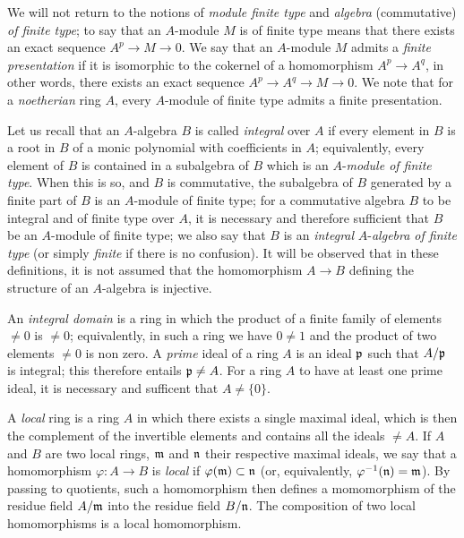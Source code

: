 \documentclass[../main.tex]{subfiles}
\begin{document}
\begin{cx}[1.0.5]
We will not return to the notions of \emph{module finite type} and
\emph{algebra} (commutative) \emph{of finite type}; to say that an $A$-module $M$
is of finite type means that there exists an exact sequence $A^p\to M\to 0$. We say that
an $A$-module $M$ admits a \emph{finite presentation} if it is isomorphic to the cokernel
of a homomorphism $A^p\to A^q$, in other words, there exists an exact sequence
$A^p\to A^q\to M\to 0$. We note that for a \emph{noetherian} ring $A$, every $A$-module
of finite type admits a finite presentation.

Let us recall that an $A$-algebra $B$ is called \emph{integral} over $A$ if every element
in $B$ is a root in $B$ of a monic polynomial with coefficients in $A$; equivalently, every
element of $B$ is contained in a subalgebra of $B$ which is an $A$-\emph{module of finite type}.
When this is so, and $B$ is commutative, the subalgebra of $B$ generated by a finite part of
$B$ is an $A$-module of finite type; for a commutative algebra $B$ to be integral and of finite
type over $A$, it is necessary and therefore sufficient that $B$ be an $A$-module of finite
type; we also say that $B$ is an \emph{integral} $A$-\emph{algebra of finite type} (or
simply \emph{finite} if there is no confusion). It will be observed that in these definitions,
it is not assumed that the homomorphism $A\to B$ defining the structure of an $A$-algebra
is injective.
\end{cx}

\begin{cx}[1.0.6]
An \emph{integral domain} is a ring in which the product of a finite family of elements
$\neq 0$ is $\neq 0$; equivalently, in such a ring we have $0\neq 1$ and the product of
two elements $\neq 0$ is non zero. A \emph{prime} ideal of a ring $A$ is an ideal $\mathfrak{p}$
such that $A/\mathfrak{p}$ is integral; this therefore entails $\mathfrak{p}\neq A$. For a ring $A$ to
have at least one prime ideal, it is necessary and sufficent that $A\neq\{0\}$.
\end{cx}

\begin{cx}[1.0.7]
A \emph{local} ring is a ring $A$ in which there exists a single maximal ideal, which is then
the complement of the invertible elements and contains all the ideals $\neq A$. If $A$ and $B$
are two local rings, $\mathfrak{m}$ and $\mathfrak{n}$ their respective maximal ideals, we say that a
homomorphism $\varphi:A\to B$ is \emph{local} if $\varphi(\mathfrak{m})\subset\mathfrak{n}$ (or, equivalently,
$\varphi^{-1}(\mathfrak{n})=\mathfrak{m}$). By passing to quotients, such a homomorphism then defines
a momomorphism of the residue field $A/\mathfrak{m}$ into the residue field $B/\mathfrak{n}$. The
composition of two local homomorphisms is a local homomorphism.
\end{cx}
\end{document}
